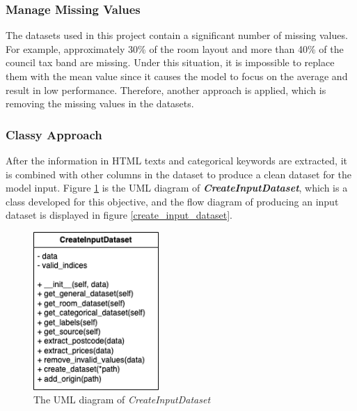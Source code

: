 \documentclass[12pt,twoside]{report}
\begin{document}
\subsubsection{Manage Missing Values}
The datasets used in this project contain a significant number of missing values. For example, approximately 30\% of the room layout and more than 40\% of the council tax band are missing. Under this situation, it is impossible to replace them with the mean value since it causes the model to focus on the average and result in low performance. Therefore, another approach is applied, which is removing the missing values in the datasets. 

\subsubsection{Classy Approach}
After the information in HTML texts and categorical keywords are extracted, it is combined with other columns in the dataset to produce a clean dataset for the model input.  Figure \ref{uml_create_input_dataset} is the UML diagram of \textit{\textbf{CreateInputDataset}}, which is a class developed for this objective, and the flow diagram of producing an input dataset is displayed in figure \ref{create_input_dataset}.

\begin{figure}[!htbp]
	\centering
	\includegraphics[height=6cm]{uml_create_input_dataset}
	\caption{The UML diagram of \textit{CreateInputDataset}}
	\label{uml_create_input_dataset}
\end{figure}
\end{document}

